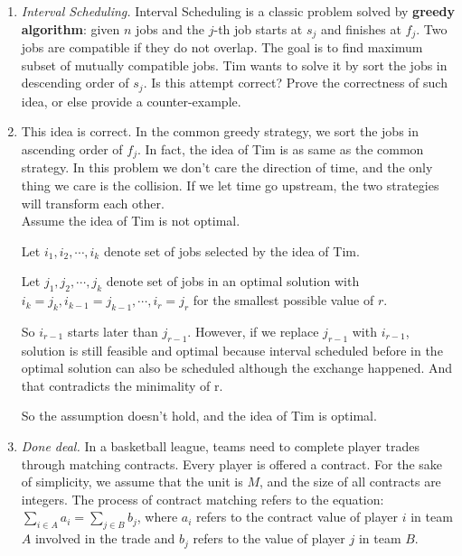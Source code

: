 \documentclass[12pt,a4paper]{article}
\makeatletter
\newtheorem*{solution}{Solution}
\theoremstyle{definition}
\renewenvironment{solution}[1][Solution] {\par\pushQED{\qed}\normalfont\topsep6\p@\@plus6\p@\relax\trivlist\item[\hskip\labelsep\bfseries#1\@addpunct{.}]\ignorespaces}{\popQED\endtrivlist\@endpefalse} \makeatother
\makeatother
\begin{document}
\begin{enumerate}
	\item \textit{Interval Scheduling.} Interval Scheduling is a classic problem solved by \textbf{greedy algorithm}: given $n$ jobs and the $j$-th job starts at $s_j$ and finishes at $f_j$. Two jobs are compatible if they do not overlap. The goal is to find maximum subset of mutually compatible jobs. Tim wants to solve it by sort the jobs in descending order of $s_j$. Is this attempt correct? Prove the correctness of such idea, or else provide a counter-example.
	    \begin{solution}
	        This idea is correct. In the common greedy strategy, we sort the jobs in ascending order of $f_j$. In fact, the idea of Tim is as same as the common strategy. In this problem we don't care the direction of time, and the only thing we care is the collision. If we let time go upstream, the two strategies will transform each other.\\
	        
	        Assume the idea of Tim is not optimal.
	        
	        Let $i_1,i_2,\cdots,i_k$ denote set of jobs selected by the idea of Tim.
	        
	        Let $j_1,j_2,\cdots,j_k$ denote set of jobs in an optimal solution with $i_k=j_k,i_{k-1}=j_{k-1},\cdots,i_{r}=j_r$ for the smallest possible value of $r$.
	        
	        So $i_{r-1}$ starts later than $j_{r-1}$. However, if we replace $j_{r-1}$ with $i_{r-1}$, solution is still feasible and optimal because interval scheduled before in the optimal solution can also be scheduled although the exchange happened. And that contradicts the minimality of r. 
	        
	        So the assumption doesn't hold, and the idea of Tim is optimal.
	    \end{solution}
	
	\item \textit{Done deal.} In a basketball league, teams need to complete player trades through matching contracts. Every player is offered a contract. For the sake of simplicity, we assume that the unit is $ M $, and the size of all contracts are integers. The process of contract matching refers to the equation: $ \sum_{i\in A} a_{i}=\sum_{j\in B} b_{j} $, where $ a_{i} $ refers to the contract value of player $ i $ in team $A$ involved in the trade and $ b_{j} $ refers to the value of player $ j $ in team $B$. 
	

\end{enumerate}
\end{document}
